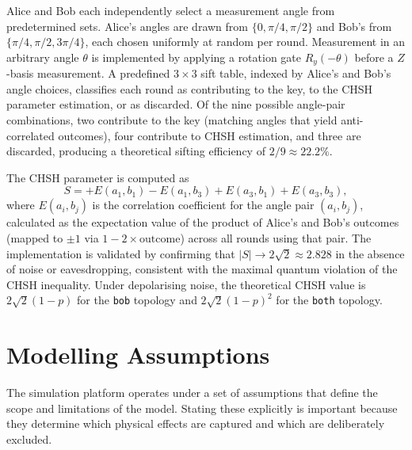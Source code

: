 \documentclass[10pt, a4paper]{report}
\begin{document}
Alice and Bob each independently select a measurement angle from predetermined sets. Alice's angles are drawn from $\{0, \pi/4, \pi/2\}$ and Bob's from $\{\pi/4, \pi/2, 3\pi/4\}$, each chosen uniformly at random per round. Measurement in an arbitrary angle $\theta$ is implemented by applying a rotation gate $R_y(-\theta)$ before a $Z$-basis measurement. A predefined $3 \times 3$ sift table, indexed by Alice's and Bob's angle choices, classifies each round as contributing to the key, to the CHSH parameter estimation, or as discarded. Of the nine possible angle-pair combinations, two contribute to the key (matching angles that yield anti-correlated outcomes), four contribute to CHSH estimation, and three are discarded, producing a theoretical sifting efficiency of $2/9 \approx 22.2\%$.

The CHSH parameter is computed as
%
\begin{equation}
\label{eq:chsh-computation}
S = +E(a_1, b_1) - E(a_1, b_3) + E(a_3, b_1) + E(a_3, b_3),
\end{equation}
%
where $E(a_i, b_j)$ is the correlation coefficient for the angle pair $(a_i, b_j)$, calculated as the expectation value of the product of Alice's and Bob's outcomes (mapped to $\pm 1$ via $1 - 2 \times \text{outcome}$) across all rounds using that pair. The implementation is validated by confirming that $|S| \rightarrow 2\sqrt{2} \approx 2.828$ in the absence of noise or eavesdropping, consistent with the maximal quantum violation of the CHSH inequality. Under depolarising noise, the theoretical CHSH value is $2\sqrt{2}(1-p)$ for the \texttt{bob} topology and $2\sqrt{2}(1-p)^2$ for the \texttt{both} topology.



\section{Modelling Assumptions}
\label{sec:modelling-assumptions}

The simulation platform operates under a set of assumptions that define the scope and limitations of the model. Stating these explicitly is important because they determine which physical effects are captured and which are deliberately excluded.
\end{document}
